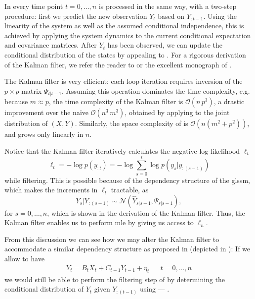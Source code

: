 In  every time point $t = 0, \dots, n$ is processed in the same way, with a two-step procedure: first we predict the new observation $Y_{t}$ based on $Y_{:t-1}$. Using the linearity of the system as well as the assumed conditional independence, this is achieved by applying the system dynamics to the current conditional expectation and covariance matrices. After $Y_{t}$ has been observed, we can update the conditional distribution of the states by appealing to . For a rigorous derivation of the Kalman filter, we refer the reader to \citep[Chapter 4]{Durbin2012Time} or the excellent monograph of \citep{Schneider1986Kalmanfilter}. 

The Kalman filter is very efficient: each loop iteration requires inversion of the $p \times p$ matrix $\Psi_{t | t - 1}$. Assuming this operation dominates the time complexity, e.g. because $m \approx p$, the time complexity of the Kalman filter is $\mathcal O(n\,p^{3})$, a drastic improvement over the naïve $\mathcal O(n^{3}\,m^{3})$, obtained by applying  to the joint distribution of $(X,Y)$. Similarly, the space complexity of  is $\mathcal O \left( n \left( m^{2} + p^{2} \right) \right)$, and grows only linearly in $n$.

Notice that the Kalman filter iteratively calculates the negative log-likelihood $\ell_{t}$
$$\ell_{t} = - \log p(y_{:t}) = - \log \sum_{s = 0}^t \log p(y_{s} | y_{:(s - 1)})$$ 
while filtering. This is possible because of the dependency structure of the \acrshort{glssm}, which makes the increments in $\ell_{t}$ tractable, as
$$
Y_{s} | Y_{:(s -1)} \sim \mathcal N \left( \hat Y_{s|s-1}, \Psi_{s|s - 1} \right),
$$
for $s = 0, \dots, n$, which is shown in the derivation of the Kalman filter. Thus, the Kalman filter enables us to perform \acrshort{mle} by giving us access to $\ell_{n}$.

From this discussion we can see how we may alter the Kalman filter to accommodate a similar dependency structure as proposed in  (depicted in ): If we allow to have 
\begin{align*}
    Y_{t} = B_{t}X_{t} + C_{t-1}Y_{t - 1} + \eta_{t} && t  = 0, \dots, n
\end{align*}
we would still be able to perform the filtering step of  by determining the conditional distribution of $Y_{t}$ given $Y_{:(t-1)}$ using  --- .


